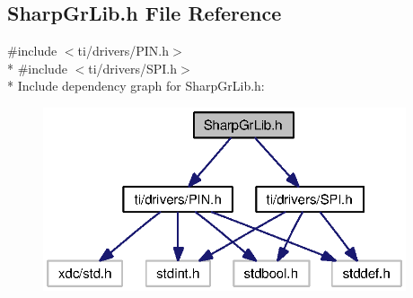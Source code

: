 \subsection{Sharp\+Gr\+Lib.\+h File Reference}
\label{_sharp_gr_lib_8h}
{\ttfamily \#include $<$ti/drivers/\+P\+I\+N.\+h$>$}\\*
{\ttfamily \#include $<$ti/drivers/\+S\+P\+I.\+h$>$}\\*
Include dependency graph for Sharp\+Gr\+Lib.\+h\+:
\nopagebreak
\begin{figure}[H]
\begin{center}
\leavevmode
\includegraphics[width=303pt]{_sharp_gr_lib_8h__incl}
\end{center}
\end{figure}
